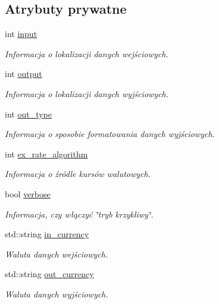 \subsection*{\-Atrybuty prywatne}
\begin{DoxyCompactItemize}
\item 
int \hyperlink{class_application_a196c830264295cd000204d0668e2262c}{input}
\begin{DoxyCompactList}\small\item\em \-Informacja o lokalizacji danych wejściowych. \end{DoxyCompactList}\item 
int \hyperlink{class_application_a3aaf22cf1c0799a24fb381b5d2a7bb52}{output}
\begin{DoxyCompactList}\small\item\em \-Informacja o lokalizacji danych wyjściowych. \end{DoxyCompactList}\item 
int \hyperlink{class_application_ae3526813bef766d79da0af787c48af3a}{out\-\_\-type}
\begin{DoxyCompactList}\small\item\em \-Informacja o sposobie formatowania danych wyjściowych. \end{DoxyCompactList}\item 
int \hyperlink{class_application_ad351bc6efdb11d1086bf82803f1c3e92}{ex\-\_\-rate\-\_\-algorithm}
\begin{DoxyCompactList}\small\item\em \-Informacja o źródle kursów walutowych. \end{DoxyCompactList}\item 
bool \hyperlink{class_application_af116b891333df3a62cf85e3dc0859e03}{verbose}
\begin{DoxyCompactList}\small\item\em \-Informacja, czy włączyć \char`\"{}tryb krzykliwy\char`\"{}. \end{DoxyCompactList}\item 
std\-::string \hyperlink{class_application_ad81fdec0c72cb080edfab33439f0d2a9}{in\-\_\-currency}
\begin{DoxyCompactList}\small\item\em \-Waluta danych wejściowych. \end{DoxyCompactList}\item 
std\-::string \hyperlink{class_application_a163202d7dc3c0863883af922d88f6b08}{out\-\_\-currency}
\begin{DoxyCompactList}\small\item\em \-Waluta danych wyjściowych. \end{DoxyCompactList}\item 

\end{DoxyCompactItemize}
